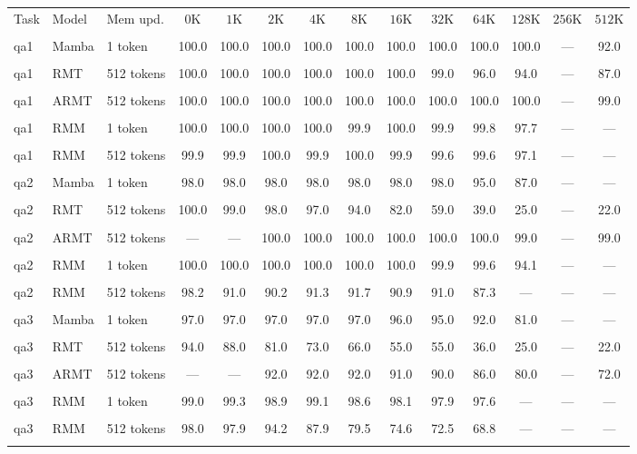\begin{tabular}{lllccccccccccc}
\toprule
Task & Model & Mem upd. & $0$K & $1\mathrm{K}$ & $2\mathrm{K}$ & $4\mathrm{K}$ & $8\mathrm{K}$ & $16\mathrm{K}$ & $32\mathrm{K}$ & $64\mathrm{K}$ & $128\mathrm{K}$ & $256\mathrm{K}$ & $512\mathrm{K}$ \\\\
\midrule
qa1 & Mamba & 1 token & 100.0 & 100.0 & 100.0 & 100.0 & 100.0 & 100.0 & 100.0 & 100.0 & 100.0 & --- & 92.0 \\\\
qa1 & RMT & 512 tokens & 100.0 & 100.0 & 100.0 & 100.0 & 100.0 & 100.0 & 99.0 & 96.0 & 94.0 & --- & 87.0 \\\\
qa1 & ARMT & 512 tokens & 100.0 & 100.0 & 100.0 & 100.0 & 100.0 & 100.0 & 100.0 & 100.0 & 100.0 & --- & 99.0 \\\\
qa1 & RMM & 1 token & 100.0 & 100.0 & 100.0 & 100.0 & 99.9 & 100.0 & 99.9 & 99.8 & 97.7 & --- & --- \\\\
qa1 & RMM & 512 tokens & 99.9 & 99.9 & 100.0 & 99.9 & 100.0 & 99.9 & 99.6 & 99.6 & 97.1 & --- & --- \\\\
\midrule
qa2 & Mamba & 1 token & 98.0 & 98.0 & 98.0 & 98.0 & 98.0 & 98.0 & 98.0 & 95.0 & 87.0 & --- & --- \\\\
qa2 & RMT & 512 tokens & 100.0 & 99.0 & 98.0 & 97.0 & 94.0 & 82.0 & 59.0 & 39.0 & 25.0 & --- & 22.0 \\\\
qa2 & ARMT & 512 tokens & --- & --- & 100.0 & 100.0 & 100.0 & 100.0 & 100.0 & 100.0 & 99.0 & --- & 99.0 \\\\
qa2 & RMM & 1 token & 100.0 & 100.0 & 100.0 & 100.0 & 100.0 & 100.0 & 99.9 & 99.6 & 94.1 & --- & --- \\\\
qa2 & RMM & 512 tokens & 98.2 & 91.0 & 90.2 & 91.3 & 91.7 & 90.9 & 91.0 & 87.3 & --- & --- & --- \\\\
\midrule
qa3 & Mamba & 1 token & 97.0 & 97.0 & 97.0 & 97.0 & 97.0 & 96.0 & 95.0 & 92.0 & 81.0 & --- & --- \\\\
qa3 & RMT & 512 tokens & 94.0 & 88.0 & 81.0 & 73.0 & 66.0 & 55.0 & 55.0 & 36.0 & 25.0 & --- & 22.0 \\\\
qa3 & ARMT & 512 tokens & --- & --- & 92.0 & 92.0 & 92.0 & 91.0 & 90.0 & 86.0 & 80.0 & --- & 72.0 \\\\
qa3 & RMM & 1 token & 99.0 & 99.3 & 98.9 & 99.1 & 98.6 & 98.1 & 97.9 & 97.6 & --- & --- & --- \\\\
qa3 & RMM & 512 tokens & 98.0 & 97.9 & 94.2 & 87.9 & 79.5 & 74.6 & 72.5 & 68.8 & --- & --- & --- \\\\
\bottomrule
\end{tabular}
